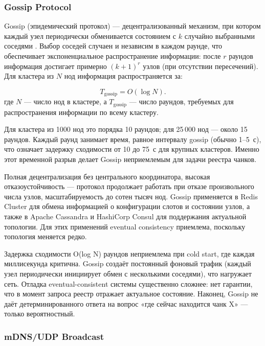 \subsubsection{Gossip Protocol}

Gossip (эпидемический протокол) --- децентрализованный механизм, при котором каждый узел периодически обменивается состоянием с $k$ случайно выбранными соседями \cite{gossip_protocol_overview}. Выбор соседей случаен и независим в каждом раунде, что обеспечивает экспоненциальное распространение информации: после $r$ раундов информация достигает примерно $(k{+}1)^r$ узлов (при отсутствии пересечений). Для кластера из $N$ нод информация распространяется за:

\begin{equation}
T_{\mathrm{gossip}} = O(\log N).
\label{eq:gossip}
\end{equation}
где $N$ --- число нод в кластере, а $T_{\mathrm{gossip}}$ --- число раундов, требуемых для распространения информации по всему кластеру.

Для кластера из 1000 нод это порядка 10 раундов; для 25\,000 нод --- около 15 раундов. Каждый раунд занимает время, равное интервалу gossip (обычно 1--5~с), что означает задержку сходимости от 10 до 75~с для крупных кластеров. Именно этот временной разрыв делает Gossip неприемлемым для задачи реестра чанков.

 Полная децентрализация без центрального координатора, высокая отказоустойчивость --- протокол продолжает работать при отказе произвольного числа узлов, масштабируемость до сотен тысяч нод. Gossip применяется в Redis Cluster для обмена информацией о конфигурации слотов и состоянии узлов, а также в Apache Cassandra и HashiCorp Consul для поддержания актуальной топологии. Для этих применений eventual consistency приемлема, поскольку топология меняется редко.

 Задержка сходимости O(log N) раундов неприемлема при cold start, где каждая миллисекунда критична. Gossip создаёт постоянный фоновый трафик (каждый узел периодически инициирует обмен с несколькими соседями), что нагружает сеть. Отладка eventual-consistent системы существенно сложнее: нет гарантии, что в момент запроса реестр отражает актуальное состояние. Наконец, Gossip не даёт детерминированного ответа на вопрос «где сейчас находится чанк X» --- только вероятностный.

\subsubsection{mDNS/UDP Broadcast}

